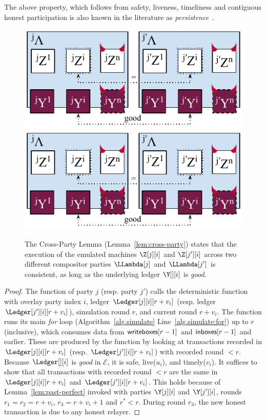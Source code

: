 The above property, which follows from safety, liveness, timeliness and
contiguous honest participation is also known in the literature as
\emph{persistence}~\cite{backbone}.

\begin{figure}
  \centering
  \iftwocolumn
  \includegraphics[width=0.7 \columnwidth,keepaspectratio]{figures/rollerblade-cross-party.pdf}
  \else
  \includegraphics[width=0.6 \columnwidth,keepaspectratio]{figures/rollerblade-cross-party.pdf}
  \fi
  \caption{The Cross-Party Lemma (Lemma~\ref{lem:cross-party}) states that
  the execution of the emulated machines $\Z[j][i]$ and $\Z[j'][i]$
  across two different compositor parties $\LLambda[j]$ and $\LLambda[j']$
  is consistent, as long as the underlying ledger $\Y[][i]$ is \emph{good}.}
  \label{fig.cross-party}
\end{figure}

\restateLemCrossParty*
\begin{proof}
  The function \emulateMachine of party $j$ (resp. party $j'$)
  calls the deterministic function \simulate with overlay party index $i$,
  ledger $\Ledger[j][i][r + v_i]$ (resp. ledger $\Ledger[j'][i][r + v_i]$), simulation round
  $r$, and current round $r + v_i$. The function \simulate runs its main
  \emph{for} loop (Algorithm~\ref{alg.simulate} Line~\ref{alg.simulate:for})
  up to $r$ (inclusive), which consumes data from $\textsf{writeboxes}[r - 1]$
  and $\textsf{inboxes}[r - 1]$ and earlier. These are produced by the function
  \prepareSimulationInputs by looking at transactions recorded in $\Ledger[j][i][r + v_i]$
  (resp. $\Ledger[j'][i][r + v_i]$) with recorded round $< r$.
  Because $\Ledger[][i]$ is \emph{good} in $\mathcal{E}$, it is safe, live($u_i$), and timely($v_i$).
  It suffices to show that all transactions with recorded round
  $< r$ are the same in $\Ledger[j][i][r + v_i]$ and $\Ledger[j'][i][r + v_i]$.
  This holds because of Lemma~\ref{lem:past-perfect} invoked with parties $\Y[j][i]$ and $\Y[j'][i]$,
  rounds $r_1 = r_2 = r + v_i$, $r_3 = r + v_i + 1$ and $r^* < r$.
  During round $r_3$, the new honest transaction is due to any honest
  relayer.\Qed
\end{proof}

